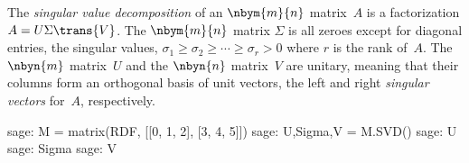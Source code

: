 The \textit{singular value decomposition} of an $\nbym{m}{n}$ matrix~$A$
is a factorization $A=U\Sigma \trans{V}$.
The $\nbym{m}{n}$ matrix $\Sigma$ 
is all zeroes except for diagonal entries, the singular values, 
$\sigma_1\geq \sigma_2 \geq \cdots \geq \sigma_r> 0$ where $r$ is the
rank of~$A$.
The $\nbyn{m}$ matrix~$U$ and the $\nbyn{n}$ matrix~$V$ are unitary, meaning
that their columns form an orthogonal basis of unit vectors, the left and 
right \textit{singular vectors} for~$A$, respectively. 
\begin{sagecommandline}
sage: M = matrix(RDF, [[0, 1, 2], [3, 4, 5]])
sage: U,Sigma,V = M.SVD()
sage: U
sage: Sigma
sage: V  
\end{sagecommandline}


